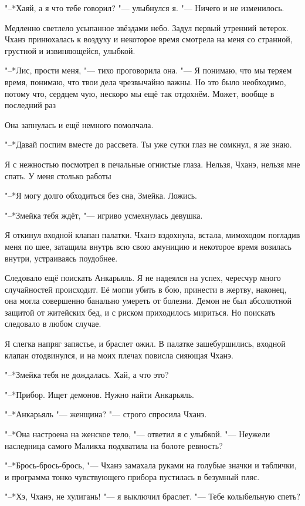 "--*Хаяй, а я что тебе говорил? "--- улыбнулся я.
"--- Ничего и не изменилось.

Медленно светлело усыпанное звёздами небо.
Задул первый утренний ветерок.
Чханэ принюхалась к воздуху и некоторое время смотрела на меня со странной, грустной и извиняющейся, улыбкой.

"--*Лис, прости меня, "--- тихо проговорила она.
"--- Я понимаю, что мы теряем время, понимаю, что твои дела чрезвычайно важны.
Но это было необходимо, потому что, сердцем чую, нескоро мы ещё так отдохнём.
Может, вообще в последний раз\ldotst

Она запнулась и ещё немного помолчала.

"--*Давай поспим вместе до рассвета.
Ты уже сутки глаз не сомкнул, я же знаю.

Я с нежностью посмотрел в печальные огнистые глаза.
Нельзя, Чханэ, нельзя мне спать.
У меня столько работы\ldotst

"--*Я могу долго обходиться без сна, Змейка.
Ложись.

"--*Змейка тебя ждёт, "--- игриво усмехнулась девушка.

Я откинул входной клапан палатки.
Чханэ вздохнула, встала, мимоходом погладив меня по шее, затащила внутрь всю свою амуницию и некоторое время возилась внутри, устраиваясь поудобнее.

Следовало ещё поискать Анкарьяль.
Я не надеялся на успех, чересчур много случайностей происходит.
Её могли убить в бою, принести в жертву, наконец, она могла совершенно банально умереть от болезни.
Демон не был абсолютной защитой от житейских бед, и с риском приходилось мириться.
Но поискать следовало в любом случае.

Я слегка напряг запястье, и браслет ожил.
В палатке зашебуршились, входной клапан отодвинулся, и на моих плечах повисла сияющая Чханэ.

"--*Змейка тебя не дождалась.
Хай, а что это?

"--*Прибор.
Ищет демонов.
Нужно найти Анкарьяль.

"--*Анкарьяль "--- женщина? "--- строго спросила Чханэ.

"--*Она настроена на женское тело, "--- ответил я с улыбкой.
"--- Неужели наследница самого Маликха подхватила на болоте ревность?

"--*Брось-брось-брось, "--- Чханэ замахала руками на голубые значки и таблички, и программа тонко чувствующего прибора пустилась в безумный пляс.

"--*Хэ, Чханэ, не хулигань! "--- я выключил браслет.
"--- Тебе колыбельную спеть?

